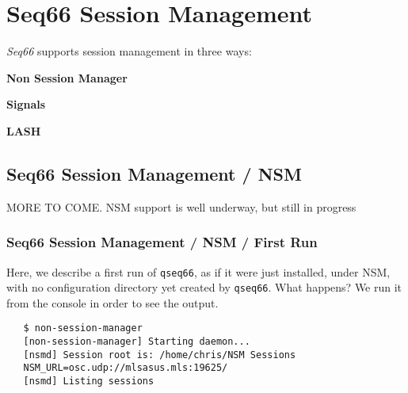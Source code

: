 %
%
%

\section{Seq66 Session Management}
\label{sec:sessions}

   \textsl{Seq66} supports session management in three ways:

   \begin{enumber}
      \item \textbf{Non Session Manager}
      \item \textbf{Signals}
      \item \textbf{LASH}
   \end{enumber}


\subsection{Seq66 Session Management / NSM}
\label{subsec:sessions_nsm}

   MORE TO COME.  NSM support is well underway, but still in progress

\subsubsection{Seq66 Session Management / NSM / First Run}
\label{subsec:sessions_nsm}

   Here, we describe a first run of \texttt{qseq66}, as if it were just
   installed, under NSM, with no configuration directory yet created by
   \texttt{qseq66}.  What happens?  We run it from the console in order to see
   the output.

\begin{verbatim}
   $ non-session-manager
   [non-session-manager] Starting daemon...
   [nsmd] Session root is: /home/chris/NSM Sessions
   NSM_URL=osc.udp://mlsasus.mls:19625/
   [nsmd] Listing sessions
\end{verbatim}

